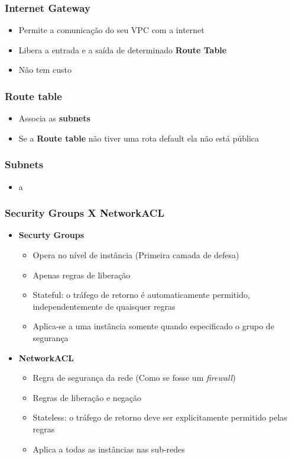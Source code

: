 \begin{frame}
	\frametitle{Internet Gateway}
	\begin{itemize}
		\item Permite a comunicação do seu VPC com a internet
		\item Libera a entrada e a saída de determinado \textbf{Route Table}
		\item Não tem custo
	\end{itemize}
\end{frame}

\begin{frame}
	\frametitle{Route table}
	\begin{itemize}
		\item Associa as \textbf{subnets}
		\item Se a \textbf{Route table} não tiver uma rota default ela não está pública
	\end{itemize}
\end{frame}

\begin{frame}
	\frametitle{Subnets}
	\begin{itemize}
		\item a
	\end{itemize}
\end{frame}

\begin{frame}
	\frametitle{Security Groups X NetworkACL}
	\begin{itemize}
		\item \textbf{Securty Groups}
		\begin{itemize}
			\item Opera no nível de instância (Primeira camada de defesa)
			\item Apenas regras de liberação
			\item Stateful: o tráfego de retorno é automaticamente permitido, independentemente de quaisquer regras
			\item Aplica-se a uma instância somente quando especificado o grupo de segurança
		\end{itemize}
		\item \textbf{NetworkACL}
		\begin{itemize}
			\item Regra de segurança da rede (Como se fosse um \textit{firewall})
			\item Regras de liberação e negação
			\item Stateless: o tráfego de retorno deve ser explicitamente permitido pelas regras
			\item Aplica a todas as instâncias nas sub-redes
		\end{itemize}
	\end{itemize}
\end{frame}

